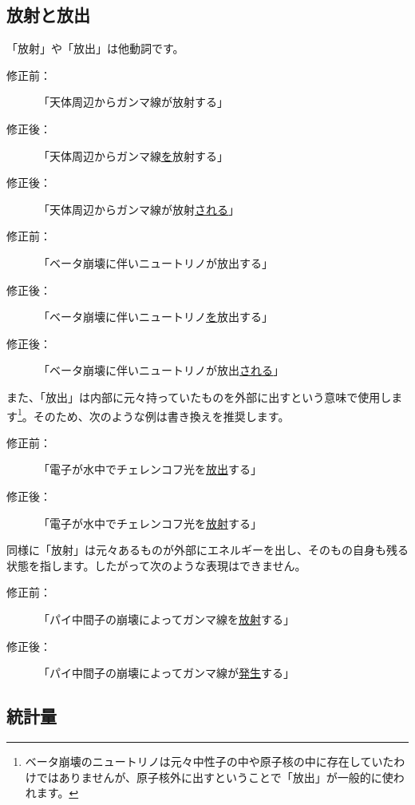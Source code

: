 \subsection{放射と放出}

「放射」や「放出」は他動詞です。

\begin{description}
\item[修正前：]「天体周辺からガンマ線が放射する」
\item[修正後：]「天体周辺からガンマ線\underline{を}放射する」
\item[修正後：]「天体周辺からガンマ線が放射\underline{される}」
\end{description}

\begin{description}
\item[修正前：]「ベータ崩壊に伴いニュートリノが放出する」
\item[修正後：]「ベータ崩壊に伴いニュートリノ\underline{を}放出する」
\item[修正後：]「ベータ崩壊に伴いニュートリノが放出\underline{される}」
\end{description}

また、「放出」は内部に元々持っていたものを外部に出すという意味で使用します\footnote{ベータ崩壊のニュートリノは元々中性子の中や原子核の中に存在していたわけではありませんが、原子核外に出すということで「放出」が一般的に使われます。}。そのため、次のような例は書き換えを推奨します。

\begin{description}
\item[修正前：]「電子が水中でチェレンコフ光を\underline{放出}する」
\item[修正後：]「電子が水中でチェレンコフ光を\underline{放射}する」
\end{description}

同様に「放射」は元々あるものが外部にエネルギーを出し、そのもの自身も残る状態を指します。したがって次のような表現はできません。

\begin{description}
\item[修正前：]「パイ中間子の崩壊によってガンマ線を\underline{放射}する」
\item[修正後：]「パイ中間子の崩壊によってガンマ線が\underline{発生}する」
\end{description}


\subsection{統計量}

